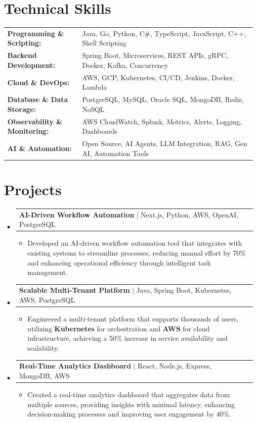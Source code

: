 \documentclass[letterpaper,10pt]{article}
\makeatletter
\newcommand{\resumeItem}[1]{
  \item{\fontsize{8pt}{9pt}\selectfont
    #1 \vspace{-3pt}
  }
}
\newcommand{\resumeProjectHeading}[2]{
    \item
    \begin{tabular*}{1.001\textwidth}{l@{\extracolsep{\fill}}r}
      \fontsize{8.5pt}{10pt}#1 & \textbf{\fontsize{8.5pt}{10pt} #2}\\
    \end{tabular*}\vspace{-7pt}
}
\newcommand{\resumeSubHeadingListStart}{\begin{itemize}[leftmargin=0pt, label={}]}
\newcommand{\resumeSubHeadingListEnd}{\end{itemize}}
\newcommand{\resumeItemListStart}{\begin{itemize}[leftmargin=*]}
\newcommand{\resumeItemListEnd}{\end{itemize}\vspace{-5pt}}
\makeatother
\begin{document}
\section{Technical Skills}
        \vspace{-14pt}
        \begin{table}[h]
            \fontsize{8pt}{9pt}\selectfont
            \begin{tabular}{p{0.3\linewidth} p{0.7\linewidth}}
                \textbf{Programming \& Scripting:} & Java, Go, Python, C\#, TypeScript, JavaScript, C++, Shell Scripting \\
                \textbf{Backend Development:} & Spring Boot, Microservices, REST APIs, gRPC, Docker, Kafka, Concurrency \\
                \textbf{Cloud \& DevOps:} & AWS, GCP, Kubernetes, CI/CD, Jenkins, Docker, Lambda \\
                \textbf{Database \& Data Storage:} & PostgreSQL, MySQL, Oracle SQL, MongoDB, Redis, NoSQL \\
                \textbf{Observability \& Monitoring:} & AWS CloudWatch, Splunk, Metrics, Alerts, Logging, Dashboards \\
                \textbf{AI \& Automation:} & Open Source, AI Agents, LLM Integration, RAG, Gen AI, Automation Tools \\
            \end{tabular}
        \end{table}
 \vspace{-18pt}

\section{Projects}
    \vspace{-5pt}
    \resumeSubHeadingListStart
          \resumeProjectHeading
            {\textbf{AI-Driven Workflow Automation} $|$ Next.js, Python, AWS, OpenAI, PostgreSQL}{}
            \resumeItemListStart
                \resumeItem{Developed an AI-driven workflow automation tool that integrates with existing systems to streamline processes, reducing manual effort by 70\% and enhancing operational efficiency through intelligent task management.}
            \resumeItemListEnd
        \vspace{-12pt}
    
        \resumeProjectHeading
            {\textbf{Scalable Multi-Tenant Platform} $|$ Java, Spring Boot, Kubernetes, AWS, PostgreSQL}{}
        \resumeItemListStart
                \resumeItem{Engineered a multi-tenant platform that supports thousands of users, utilizing \textbf{Kubernetes} for orchestration and \textbf{AWS} for cloud infrastructure, achieving a 50\% increase in service availability and scalability.}
        \resumeItemListEnd
      \vspace{-12pt}
      \resumeProjectHeading
        {\textbf{Real-Time Analytics Dashboard} $|$ React, Node.js, Express, MongoDB, AWS}{}
    \resumeItemListStart
            \resumeItem{Created a real-time analytics dashboard that aggregates data from multiple sources, providing insights with minimal latency, enhancing decision-making processes and improving user engagement by 40\%.}
    \resumeItemListEnd
    \resumeSubHeadingListEnd
\end{document}
